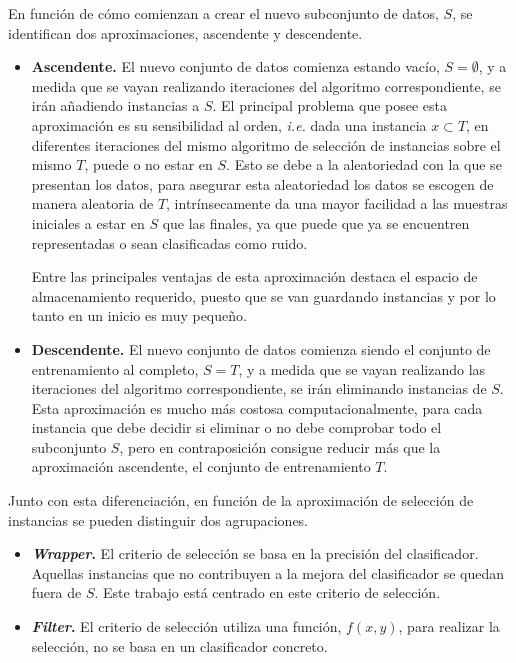 En función de cómo comienzan a crear el nuevo subconjunto de datos, $S$, se identifican dos aproximaciones, ascendente y descendente.
\begin{itemize}
\item \textbf{Ascendente.} El nuevo conjunto de datos comienza estando vacío, $S = \emptyset$, y a medida que se vayan realizando iteraciones del algoritmo correspondiente, se irán añadiendo instancias a $S$. El principal problema que posee esta aproximación es su sensibilidad al orden, \textit{i.e.} dada una instancia $x \subset T$, en diferentes iteraciones del mismo algoritmo de selección de instancias sobre el mismo $T$, puede o no estar en $S$. Esto se debe a la aleatoriedad con la que se presentan los datos, para asegurar esta aleatoriedad los datos se escogen de manera aleatoria de $T$, intrínsecamente da una mayor facilidad a las muestras iniciales a estar en $S$ que las finales, ya que puede que ya se encuentren representadas o sean clasificadas como ruido.

Entre las principales ventajas de esta aproximación destaca el espacio de almacenamiento requerido, puesto que se van guardando instancias y por lo tanto en un inicio es muy pequeño.

\item \textbf{Descendente.} El nuevo conjunto de datos comienza siendo el conjunto de entrenamiento al completo, $S = T$, y a medida que se vayan realizando las iteraciones del algoritmo correspondiente, se irán eliminando instancias de $S$. Esta aproximación es mucho más costosa computacionalmente, para cada instancia que debe decidir si eliminar o no debe comprobar todo el subconjunto $S$, pero en contraposición consigue reducir más que la aproximación ascendente, el conjunto de entrenamiento $T$.
\end{itemize}

Junto con esta diferenciación, en función de la aproximación de selección de instancias se pueden distinguir dos agrupaciones.
\begin{itemize}
\item \textbf{\textit{Wrapper}.} El criterio de selección se basa en la precisión del clasificador. Aquellas instancias que no contribuyen a la mejora del clasificador se quedan fuera de $S$. Este trabajo está centrado en este criterio de selección.
\item \textbf{\textit{Filter}.} El criterio de selección utiliza una función, $f(x, y)$, para realizar la selección, no se basa en un clasificador concreto.
\end{itemize}

